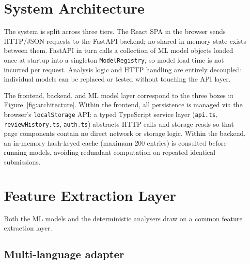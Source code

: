 \documentclass[12pt, oneside]{report}
\begin{document}
\section{System Architecture}
\label{sec:arch}

The system is split across three tiers. The React SPA in the browser sends HTTP/JSON
requests to the FastAPI backend; no shared in-memory state exists between them.
FastAPI in turn calls a collection of ML model objects loaded once at startup into a
singleton \texttt{ModelRegistry}, so model load time is not incurred per request.
Analysis logic and HTTP handling are entirely decoupled: individual models can be
replaced or tested without touching the API layer.

The frontend, backend, and ML model layer correspond to the three boxes in
Figure~\ref{fig:architecture}. Within the frontend, all persistence is managed via the
browser's \texttt{localStorage} API; a typed TypeScript service layer (\texttt{api.ts},
\texttt{reviewHistory.ts}, \texttt{auth.ts}) abstracts HTTP calls and storage reads so
that page components contain no direct network or storage logic. Within the backend,
an in-memory hash-keyed cache (maximum 200 entries) is consulted before running
models, avoiding redundant computation on repeated identical submissions.

\section{Feature Extraction Layer}
\label{sec:features}

Both the ML models and the deterministic analysers draw on a common feature extraction
layer.

\subsection{Multi-language adapter}
\label{ssec:multi-language-adapter}
\end{document}
